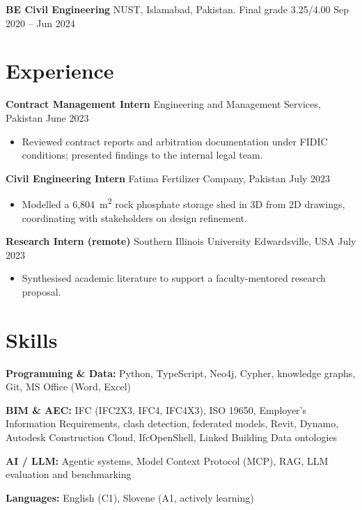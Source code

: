 \documentclass[a4paper,10.5pt]{article}
\newcommand{\datefill}{\dotfill}
\newcommand{\entry}[3]{\vspace{2.5pt}\noindent\textbf{#1} \textbar{} #2 \datefill{} #3\par\vspace{0.5pt}}
\newcommand{\skillrow}[2]{\noindent\textbf{#1:} #2\par\vspace{1pt}}
\begin{document}
\entry{BE Civil Engineering}{NUST, Islamabad, Pakistan. Final grade 3.25/4.00}{Sep 2020 -- Jun 2024}

\section{Experience}
\entry{Contract Management Intern}{Engineering and Management Services, Pakistan}{June 2023}
\begin{itemize}
  \item Reviewed contract reports and arbitration documentation under FIDIC
        conditions; presented findings to the internal legal team.
\end{itemize}

\entry{Civil Engineering Intern}{Fatima Fertilizer Company, Pakistan}{July 2023}
\begin{itemize}
  \item Modelled a 6,804~m\textsuperscript{2} rock phosphate storage shed in 3D from
        2D drawings, coordinating with stakeholders on design refinement.
\end{itemize}

\entry{Research Intern (remote)}{Southern Illinois University Edwardsville, USA}{July 2023}

\begin{itemize}
  \item Synthesised academic literature to support a faculty-mentored research proposal.
\end{itemize}

\section{Skills}

\skillrow{Programming \& Data}{Python, TypeScript, Neo4j, Cypher, knowledge graphs, Git, MS Office (Word, Excel)}
\skillrow{BIM \& AEC}{IFC (IFC2X3, IFC4, IFC4X3), ISO 19650, Employer's Information Requirements, clash detection, federated models, Revit, Dynamo, Autodesk Construction Cloud, IfcOpenShell, Linked Building Data ontologies}
\skillrow{AI / LLM}{Agentic systems, Model Context Protocol (MCP), RAG, LLM evaluation and benchmarking}

\skillrow{Languages}{English (C1), Slovene (A1, actively learning)}
\end{document}

